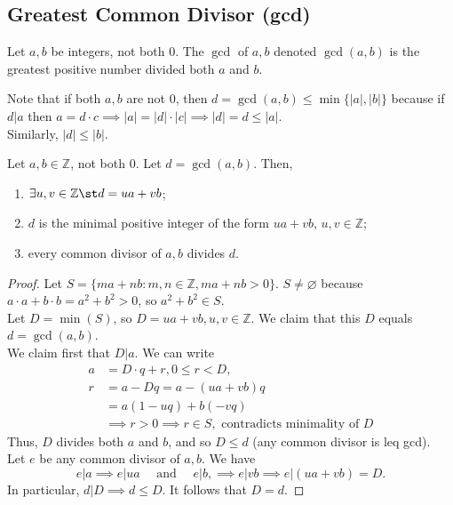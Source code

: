 \documentclass[12pt,oneside]{article}
\begin{document}
\subsection{Greatest Common Divisor (gcd)}

\begin{definition}[GCD]
  Let $a,b$ be integers, not both $0$.  The $\gcd$ of $a,b$ denoted $\gcd(a,b)$ is the greatest positive number divided both $a$ and $b$.
\end{definition}

\begin{remark}
  Note that if both $a,b$ are not $0$, then $d = \gcd(a,b) \leq \min\{|a|,|b|\}$ because if $d | a$ then $a = d \cdot c \implies |a| = |d| \cdot |c| \implies |d| = d \leq |a|$.\\
  Similarly, $|d| \leq |b|$.
\end{remark}

\begin{theorem}\label{thm:gcdproperties}
  Let $a,b \in \mathbb{Z}$, not both $0$. Let $d = \gcd (a,b)$. Then,
  \begin{enumerate}
    \item $\exists u,v \in \mathbb{Z} \st d = ua + vb$;
    \item $d$ is the minimal positive integer of the form $ua + vb$, $u, v \in \mathbb{Z}$;
    \item every common divisor of $a,b$ divides $d$.
  \end{enumerate}
\end{theorem}

\begin{proof}
  Let $S = \{ma + nb : m,n \in \mathbb{Z}, ma + nb > 0\}$. $S \neq \varnothing$ because $a\cdot a + b \cdot b = a^2 +b^2 > 0$, so $a^2 + b^2 \in S$.\\
  Let $D = \min(S)$, so $D = ua + vb, u,v \in \mathbb{Z}$. We claim that this $D$ equals $d = \gcd(a,b)$.\\ We claim first that $D | a$. We can write \begin{align*}
    a &= D \cdot q + r, 0 \leq r < D,\\
    r &= a - Dq = a - (ua + vb)q\\
    &= a(1-uq) + b(-vq)\\
    &\implies r > 0 \implies r \in S, \text{ contradicts minimality of } D
  \end{align*}
  Thus, $D$ divides both $a$ and $b$, and so $D \leq d$ (any common divisor is leq gcd).\\
  Let $e$ be any common divisor of $a,b$. We have
  $$e | a \implies e |ua \quad \text{ and } \quad e|b ,\implies e|vb \implies e|(ua+vb)=D.$$ In particular, $d|D \implies d \leq D$. It follows that $D = d$.
\end{proof}
\end{document}
